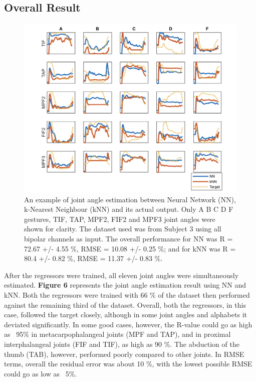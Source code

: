 \documentclass[conference]{IEEEtran}
\begin{document}
\subsection{Overall Result}
\begin{figure}
    \centering
    \includegraphics[width=\columnwidth]{figure6.png}
    \caption{An example of joint angle estimation between Neural Network (NN), k-Nearest Neighbour 
(kNN) and its actual output. Only A B C D F gestures, TIF, TAP, MPF2, FIF2 and MPF3 joint angles 
were shown for clarity. The dataset used was from Subject 3 
using all bipolar channels as input. The overall performance for NN was R = 72.67 +/- 4.55 \%, RMSE 
= 10.08 +/- 0.25 \%; and for kNN was R = 80.4 +/- 0.82 \%, RMSE = 11.37 +/- 0.83 \%.}
    \label{figure6}
\end{figure}

After the regressors were trained, all eleven joint angles were simultaneously estimated. \textbf{Figure 6}
represents the joint angle estimation result using NN and kNN. Both the regressors were trained with 66 \% 
of the dataset then performed against the remaining third of the dataset. Overall, both the regressors, in this 
case, followed the target closely, although in some joint angles and alphabets it deviated significantly. In some good cases, however, the R-value could go as high as ~95\% in 
metacarpophalangeal joints (MPF and TAP), and in proximal interphalangeal joints (FIF and TIF), as high 
as 90 \%. The abduction of the thumb (TAB), however, performed poorly compared to other joints. In RMSE 
terms, overall the residual error was about 10 \%, with the lowest possible RMSE could go as low as ~5\%.
\end{document}
